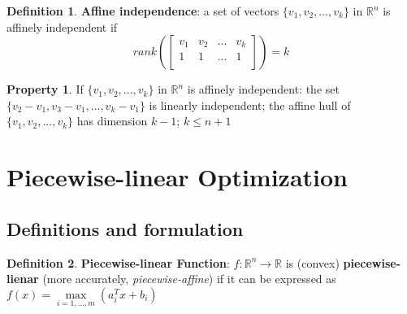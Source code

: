 \documentclass[10pt]{article}
\def\R{\mathbb{R}}
\def\goes{\rightarrow}
\theoremstyle{definition}
\newtheorem{defn}{Definition}[section]
\newtheorem{pty}{Property}[section]
\begin{document}
\begin{defn}
	\textbf{Affine independence}: a set of vectors $\{v_1, v_2, ..., v_k\}$ in $\R^n$ is affinely independent if
	\begin{equation*}
		rank(
		\begin{bmatrix}
			v_1 & v_2 & ... & v_k \\
			1   & 1   & ... & 1   \\
		\end{bmatrix}
		) = k
	\end{equation*}
\end{defn}

\begin{pty}
	If $\{v_1, v_2, ..., v_k\}$ in $\R^n$ is affinely independent:
	the set $\{v_2 - v_1, v_3 - v_1, \dots, v_k - v_1\}$ is linearly independent;
	the affine hull of $\{v_1, v_2, ..., v_k\}$ has dimension $k - 1$;
	$k \le n + 1$
\end{pty}


\section{Piecewise-linear Optimization}

\subsection{Definitions and formulation}
\begin{defn}
	\textbf{Piecewise-linear Function}: $f: \R^n \goes \R$ is (convex) \textbf{piecewise-lienar} (more accurately, \textit{piecewise-affine}) if it can be expressed as $f(x) = \max\limits_{i=1,...,m}(a_{i}^Tx+b_i)$
\end{defn}
\end{document}

